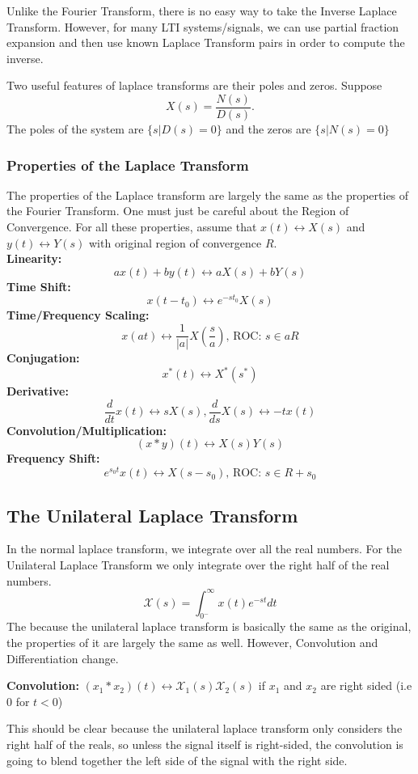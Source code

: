 Unlike the Fourier Transform, there is no easy way to take the Inverse Laplace Transform.
However, for many LTI systems/signals, we can use partial fraction expansion and then use known Laplace Transform pairs in order to compute the inverse.

Two useful features of laplace transforms are their poles and zeros. Suppose
\[
  X(s) = \frac{N(s)}{D(s)}.
\]
The poles of the system are $\{s | D(s)=0\}$ and the zeros are $\{s | N(s)=0\}$
\subsubsection{Properties of the Laplace Transform}
The properties of the Laplace transform are largely the same as the properties of the Fourier Transform. One must just be careful about the Region of Convergence.
For all these properties, assume that $x(t) \leftrightarrow X(s)$ and $y(t) \leftrightarrow Y(s)$ with original region of convergence $R$.\\
\textbf{Linearity: } 
\[
ax(t) + by(t) \leftrightarrow aX(s) + bY(s)
\]
\textbf{Time Shift: }
\[
x(t-t_0) \leftrightarrow e^{-s t_0}X(s)
\]
\textbf{Time/Frequency Scaling: }
\[
x(at) \leftrightarrow \frac{1}{|a|}X(\frac{s}{a})\text{, ROC: }s\in aR
\]
\textbf{Conjugation: } 
\[
x^*(t) \leftrightarrow X^*(s^*)
\]
\textbf{Derivative: } 
\[
\frac{d}{dt}x(t) \leftrightarrow s X(s), \frac{d}{ds}X(s) \leftrightarrow -t x(t)
\]
\textbf{Convolution/Multiplication: } 
\[
(x*y)(t) \leftrightarrow X(s)Y(s)
\]
\textbf{Frequency Shift: } 
\[
e^{s_0 t}x(t) \leftrightarrow X(s - s_0)\text{, ROC: }s\in R+s_0
\]
\subsection{The Unilateral Laplace Transform}
In the normal laplace transform, we integrate over all the real numbers. For the Unilateral Laplace Transform
we only integrate over the right half of the real numbers.
\[
\mathcal{X}(s)=\int_{0^-}^{\infty}{x(t)e^{-st}dt}
\]
The because the unilateral laplace transform is basically the same as the original, the properties of it are largely the same as well.
However, Convolution and Differentiation change.

\textbf{Convolution:} $(x_1*x_2)(t) \leftrightarrow \mathcal{X}_1(s)\mathcal{X}_2(s)$ if $x_1$ and $x_2$ are right sided (i.e 0 for $t<0$)

This should be clear because the unilateral laplace transform only considers the right half of the reals, so unless the signal itself is right-sided,
the convolution is going to blend together the left side of the signal with the right side.

